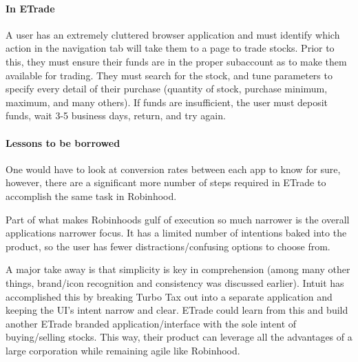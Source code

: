 \paragraph{In ETrade}
A user has an extremely cluttered browser application and must identify which action in the navigation tab will take them to a page to trade stocks. Prior to this, they must ensure their funds are in the proper subaccount as to make them available for trading. They must search for the stock, and tune parameters to specify every detail of their purchase (quantity of stock, purchase minimum, maximum, and many others). If funds are insufficient, the user must deposit funds, wait 3-5 business days, return, and try again.

\paragraph{Lessons to be borrowed}
One would have to look at conversion rates between each app to know for sure, however, there are a significant more number of steps required in ETrade to accomplish the same task in Robinhood.

Part of what makes Robinhoods gulf of execution so much narrower is the overall applications narrower focus. It has a limited number of intentions baked into the product, so the user has fewer distractions/confusing options to choose from.

A major take away is that simplicity is key in comprehension (among many other things, brand/icon recognition and consistency was discussed earlier). Intuit has accomplished this by breaking Turbo Tax out into a separate application and keeping the UI's intent narrow and clear. ETrade could learn from this and build another ETrade branded application/interface with the sole intent of buying/selling stocks. This way, their product can leverage all the advantages of a large corporation while remaining agile like Robinhood.



